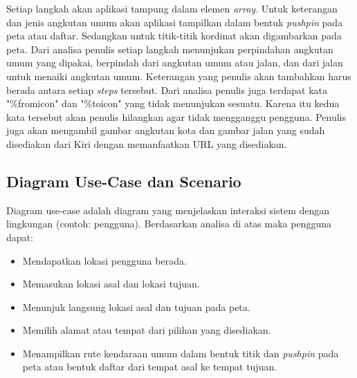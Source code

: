 \hspace{0.5cm} Setiap langkah akan aplikasi tampung dalam elemen \textit{array}. Untuk keterangan dan jenis angkutan umum akan aplikasi tampilkan dalam bentuk \textit{pushpin} pada peta atau daftar. Sedangkan untuk titik-titik kordinat akan digambarkan pada peta. Dari analisa penulis setiap langkah menunjukan perpindahan angkutan umum yang dipakai, berpindah dari angkutan umum atau jalan, dan dari jalan untuk menaiki angkutan umum. Keterangan yang penulis akan tambahkan harus berada antara setiap \textit{steps} tersebut. Dari analisa penulis juga terdapat kata "\%fromicon" dan "\%toicon" yang tidak menunjukan sesuatu. Karena itu kedua kata tersebut akan penulis hilangkan agar tidak mengganggu pengguna. Penulis juga akan mengambil gambar angkutan kota dan gambar jalan yang sudah disediakan dari Kiri dengan memanfaatkan URL yang disediakan. 

\subsection{Diagram Use-Case dan Scenario}
\label{lab:Diagram Use-Case dan Scenario}
\hspace{0.5cm} Diagram use-case adalah diagram yang menjelaskan interaksi sistem dengan lingkungan (contoh: pengguna). Berdasarkan analisa di atas maka pengguna dapat:
\begin{itemize}
	\item Mendapatkan lokasi pengguna berada.
	\item Memasukan lokasi asal dan lokasi tujuan.
	\item Menunjuk langsung lokasi asal dan tujuan pada peta.
	\item Memilih alamat atau tempat dari pilihan yang disediakan.
	\item Menampilkan rute kendaraan umum dalam bentuk titik dan \textit{pushpin} pada peta atau bentuk daftar dari tempat asal ke tempat tujuan.
\end{itemize}

